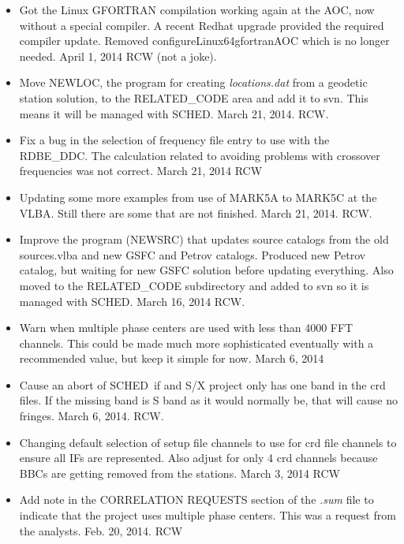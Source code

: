 \documentclass{report}
\newcommand{\sched}{{\sc SCHED}}
\newcommand{\schedb}{{\sc SCHED~}}
\begin{document}
\begin{itemize}
\item Got the Linux GFORTRAN compilation working again at the AOC, now
without a special compiler.  A recent Redhat upgrade provided the
required compiler update.  Removed configureLinux64gfortranAOC which is
no longer needed.  April 1, 2014  RCW  (not a joke). 

\item Move NEWLOC, the program for creating {\sl locations.dat} from a
geodetic station solution, to the RELATED\_CODE area and add it to
svn.  This means it will be managed with \sched.  March 21, 2014.  RCW.

\item Fix a bug in the selection of frequency file entry to use with
the RDBE\_DDC.  The calculation related to avoiding problems with crossover
frequencies was not correct.   March 21, 2014  RCW

\item Updating some more examples from use of MARK5A to MARK5C at the
VLBA.  Still there are some that are not finished.  March 21, 2014.  RCW.

\item Improve the program (NEWSRC) that updates source catalogs from
the old sources.vlba and new GSFC and Petrov catalogs.  Produced new
Petrov catalog, but waiting for new GSFC solution before updating
everything.  Also moved to the RELATED\_CODE subdirectory and added
to svn so it is managed with \sched.  March 16, 2014  RCW.

\item Warn when multiple phase centers are used with less than 4000
FFT channels.  This could be made much more sophisticated eventually
with a recommended value, but keep it simple for now.  March 6, 2014

\item Cause an abort of \schedb if and S/X project only has one band
in the crd files.  If the missing band is S band as it would normally
be, that will cause no fringes.  March 6, 2014.  RCW.

\item  Changing default selection of setup file channels to use for crd
file channels to ensure all IFs are represented.  Also adjust for only
4 crd channels because BBCs are getting removed from the stations.
March 3, 2014 RCW

\item  Add note in the CORRELATION REQUESTS section of the {\sl .sum} file
to indicate that the project uses multiple phase centers.  This was a
request from the analysts.  Feb. 20, 2014.  RCW


\end{itemize}
\end{document}

